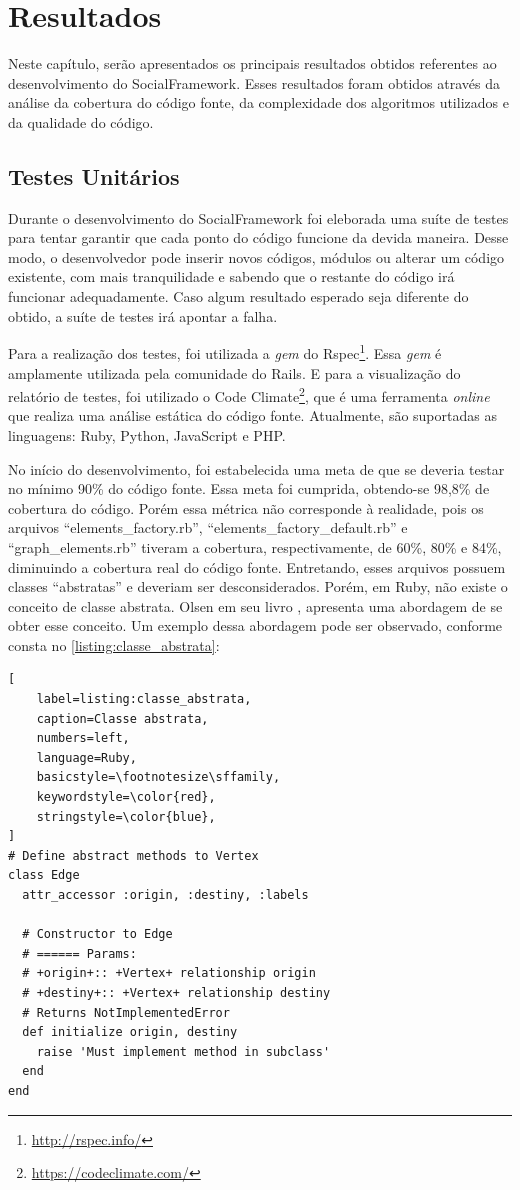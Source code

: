 \chapter{Resultados}
\label{chapter:Resultados}

Neste capítulo, serão apresentados os principais resultados obtidos referentes ao desenvolvimento do SocialFramework. Esses resultados foram obtidos através da análise da cobertura do código fonte, da complexidade dos algoritmos utilizados e da qualidade do código.

\section{Testes Unitários}

Durante o desenvolvimento do SocialFramework foi eleborada uma suíte de testes para tentar garantir que cada ponto do código funcione da devida maneira. Desse modo, o desenvolvedor pode inserir novos códigos, módulos ou alterar um código existente, com mais tranquilidade e sabendo que o restante do código irá funcionar adequadamente. Caso algum resultado esperado seja diferente do obtido, a suíte de testes irá apontar a falha.

Para a realização dos testes, foi utilizada a \textit{gem} do Rspec\footnote{\url{http://rspec.info/}}. Essa \textit{gem} é amplamente utilizada pela comunidade do Rails. E para a visualização do relatório de testes, foi utilizado o Code Climate\footnote{\url{https://codeclimate.com/}}, que é uma ferramenta \textit{online} que realiza uma análise estática do código fonte. Atualmente, são suportadas as linguagens: Ruby, Python, JavaScript e PHP.

No início do desenvolvimento, foi estabelecida uma meta de que se deveria testar no mínimo 90\% do código fonte. Essa meta foi cumprida, obtendo-se 98,8\% de cobertura do código. Porém essa métrica não corresponde à realidade, pois os arquivos ``elements\_factory.rb'', ``elements\_factory\_default.rb'' e ``graph\_elements.rb'' tiveram a cobertura, respectivamente, de 60\%, 80\% e 84\%, diminuindo a cobertura real do código fonte. Entretando, esses arquivos possuem classes ``abstratas'' e deveriam ser desconsiderados. Porém, em Ruby, não existe o conceito de classe abstrata. Olsen em seu livro \cite{Olsen:2007}, apresenta uma abordagem de se obter esse conceito. Um exemplo dessa abordagem pode ser observado, conforme consta no \ref{listing:classe_abstrata}:

 \begin{lstlisting}[
    label=listing:classe_abstrata,
    caption=Classe abstrata,
    numbers=left,
    language=Ruby,
    basicstyle=\footnotesize\sffamily,
    keywordstyle=\color{red},
    stringstyle=\color{blue},
]
# Define abstract methods to Vertex
class Edge
  attr_accessor :origin, :destiny, :labels
  
  # Constructor to Edge
  # ====== Params:
  # +origin+:: +Vertex+ relationship origin
  # +destiny+:: +Vertex+ relationship destiny
  # Returns NotImplementedError
  def initialize origin, destiny
    raise 'Must implement method in subclass'
  end
end
\end{lstlisting}

